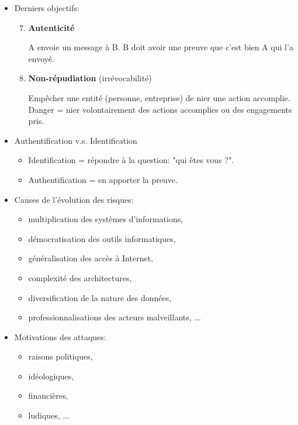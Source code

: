 \documentclass[a4paper]{article}
\begin{document}
\begin{itemize}
\item Derniers objectifs:
\begin{enumerate} \setcounter{enumi}{6}
    \item \textbf{Autenticité}
    \begin{example}
        A envoie un message à B. B doit avoir une preuve que c'est bien A qui l'a envoyé.
    \end{example}
    \item \textbf{Non-répudiation} (irrévocabilité)
    \begin{example}
        Empêcher une entité (personne, entreprise) de nier une action accomplie. \\
        Danger = nier volontairement des actions accomplies ou des engagements pris.
    \end{example}
\end{enumerate}





\item Authentification v.s. Identification
\begin{itemize}
    \item Identification = répondre à la question: "qui êtes vous ?".
    \item Authentification = en apporter la preuve.
\end{itemize}





\item Causes de l'évolution des risques:
\begin{itemize}
    \item multiplication des systèmes d'informations,
    \item démocratisation des outils informatiques,
    \item généralisation des accès à Internet,
    \item complexité des architectures,
    \item diversification de la nature des données,
    \item professionnalisations des acteurs malveillants, ...
\end{itemize}





\item Motivations des attaques:
\begin{itemize}
    \item raisons politiques,
    \item idéologiques,
    \item financières,
    \item ludiques, ...
\end{itemize}






\end{itemize}
\end{document}
